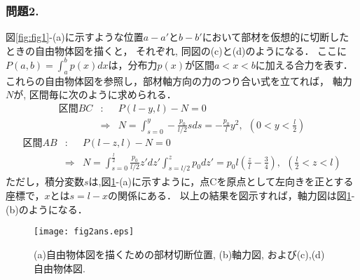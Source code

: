 \documentclass[10pt,a4j]{jarticle}
\begin{document}
\subsubsection*{問題2.}
図\ref{fig:fig1}-(a)に示すような位置$a-a'$と$b-b'$において部材を仮想的に切断したときの自由物体図を描くと，
それぞれ, 同図の(c)と(d)のようになる．
ここに$P(a,b)=\int_a^bp(x)dx$は，分布力$p(x)$が区間$a<x<b$に加える合力を表す．
これらの自由物体図を参照し，部材軸方向の力のつり合い式を立てれば，
軸力$N$が, 区間毎に次のように求められる．
\begin{eqnarray}
	区間BC&:& 
	P(l-y,l)-N = 0  \\ \nonumber
	 &\Rightarrow &
		N = \int_{s=0}^y -\frac{p_0}{l/2}s ds = -\frac{p_0}{l}y^2, \ \ 
		\left(0< y < \frac{l}{2}\right)
\end{eqnarray}
\begin{eqnarray}
	区間AB &:&
	P(l-z,l)-N = 0 \nonumber \\
	&\Rightarrow &
	N=\int_{s=0}^{\frac{l}{2}}\frac{p_0}{l/2}z'dz' 
	  \int_{s=l/2}^{z}p_0dz' 
	=p_0l \left( \frac{z}{l}-\frac{3}{4}\right) , \ \ \left( \frac{l}{2}< z < l \right)
\end{eqnarray}
ただし，積分変数$s$は,図\ref{fig:fig2}-(a)に示すように，点Cを原点として左向きを正とする
座標で，$x$とは$s=l-x$の関係にある．
以上の結果を図示すれば，軸力図は図\ref{fig:fig2}-(b)のようになる．
\begin{figure}[h]
	\vspace{-3mm}
	\begin{center}
	\texttt{[image: fig2ans.eps]} 
	\end{center}
	\vspace{-5mm}
	\caption{(a)自由物体図を描くための部材切断位置, (b)軸力図,
	および(c),(d)自由物体図.} 
	\label{fig:fig2}
\end{figure}
\end{document}
